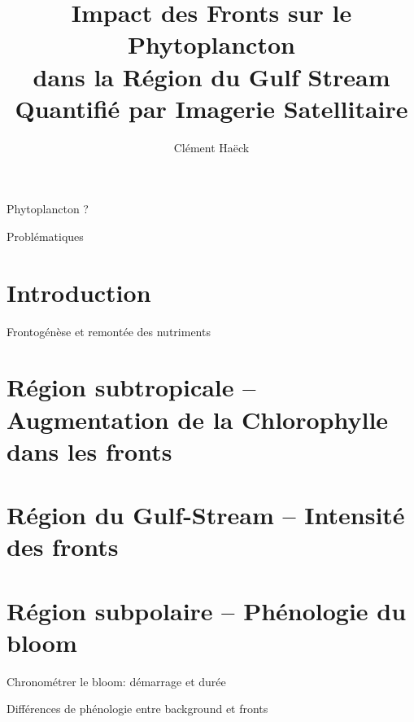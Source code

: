 \documentclass[11pt, french]{beamer}
\title{%
  Impact des Fronts sur le Phytoplancton\\
  dans la Région du Gulf Stream\\
  Quantifié par Imagerie Satellitaire
}
\author{Clément Haëck}
\institute{%
  Laboratoire d'Océanographie et du Climat\\Expérimentations et Analyses Numériques
}
\begin{document}
{
  \begin{frame}
    \titlepage%
  \end{frame}
}

\begin{frame}{Phytoplancton ?}
\end{frame}

\begin{frame}{Problématiques}
\end{frame}

\section{Introduction}

\begin{frame}{Frontogénèse et remontée des nutriments}
  \centering
\end{frame}

\section{Région subtropicale -- Augmentation de la Chlorophylle dans les fronts}

\section{Région du Gulf-Stream -- Intensité des fronts}

\section{Région subpolaire -- Phénologie du bloom}

\begin{frame}{Chronométrer le bloom: démarrage et durée}
\end{frame}

\begin{frame}{Différences de phénologie entre background et fronts}
\end{frame}
\end{document}
